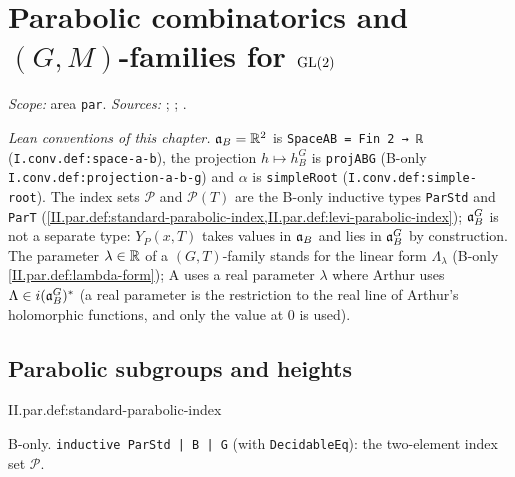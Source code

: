 \chapter{\texorpdfstring{Parabolic combinatorics and $(G,M)$-families for $\mathrm{GL}(2)$}{Parabolic combinatorics and (G,M)-families for GL(2)}}\label{ch:ch-02-parabolic}

\noindent\emph{Scope:} area \texttt{par}. \emph{Sources:} \cite[§§5, 17]{AIntro}; \cite[Lecture VII]{Gel}; \cite{A-FE2}.

\noindent\emph{Lean conventions of this chapter.} $\mathfrak{a}_B=\mathbb{R}^2$ is \texttt{SpaceAB = Fin 2 → ℝ} (\texttt{I.conv.def:space-a-b}), the projection
$h\mapsto h_B^G$ is \texttt{projABG} (B-only \texttt{I.conv.def:projection-a-b-g}) and $\alpha$ is \texttt{simpleRoot} (\texttt{I.conv.def:simple-root}). The index
sets $\mathcal P$ and $\mathcal P(T)$ are the B-only inductive types \texttt{ParStd} and \texttt{ParT} (\cref{II.par.def:standard-parabolic-index,II.par.def:levi-parabolic-index});
$\mathfrak{a}_B^G$ is not a separate type: $Y_P(x,T)$ takes values in $\mathfrak{a}_B$ and lies in $\mathfrak{a}_B^G$ by construction. The parameter $\lambda\in\mathbb{R}$ of a $(G,T)$-family stands
for the linear form $\Lambda_\lambda$ (B-only \cref{II.par.def:lambda-form}); A uses a real parameter $\lambda$ where Arthur uses $\Lambda\in i(\mathfrak{a}_B^G)^*$ (a real parameter is the restriction to the real line of Arthur's holomorphic functions, and only the value at $0$ is used).

\section{Parabolic subgroups and heights}\label{sec:par-heights}

\begin{definition}
\bonly
{}
\end{definition}
\begin{tfformal}{II.par.def:standard-parabolic-index}
\begin{tffidelity}
B-only. \texttt{inductive ParStd | B | G} (with \texttt{DecidableEq}): the two-element index set $\mathcal P$.
\end{tffidelity}
\end{tfformal}

